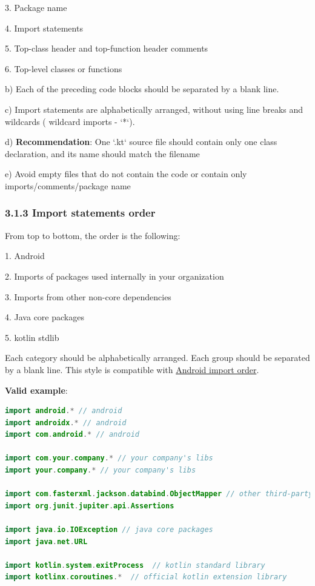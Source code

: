 3.	Package name

4.	Import statements

5.	Top-class header and top-function header comments

6.	Top-level classes or functions



b) Each of the preceding code blocks should be separated by a blank line. 



c) Import statements are alphabetically arranged, without using line breaks and wildcards ( wildcard imports - `*`). 



d) \textbf{Recommendation}: One `.kt` source file should contain only one class declaration, and its name should match the filename



e) Avoid empty files that do not contain the code or contain only imports/comments/package name



\subsubsection*{\textbf{3.1.3 Import statements order}}
\leavevmode\newline

\label{sec:3.1.3}



From top to bottom, the order is the following:

1. Android

2. Imports of packages used internally in your organization

3. Imports from other non-core dependencies

4. Java core packages

5. kotlin stdlib



Each category should be alphabetically arranged. Each group should be separated by a blank line. This style is compatible with  \href{https://source.android.com/setup/contribute/code-style#order-import-statements}{Android import order}.



\textbf{Valid example}:

\begin{lstlisting}[language=Kotlin]
import android.* // android
import androidx.* // android
import com.android.* // android

import com.your.company.* // your company's libs
import your.company.* // your company's libs

import com.fasterxml.jackson.databind.ObjectMapper // other third-party dependencies
import org.junit.jupiter.api.Assertions

import java.io.IOException // java core packages
import java.net.URL

import kotlin.system.exitProcess  // kotlin standard library
import kotlinx.coroutines.*  // official kotlin extension library
\end{lstlisting}


